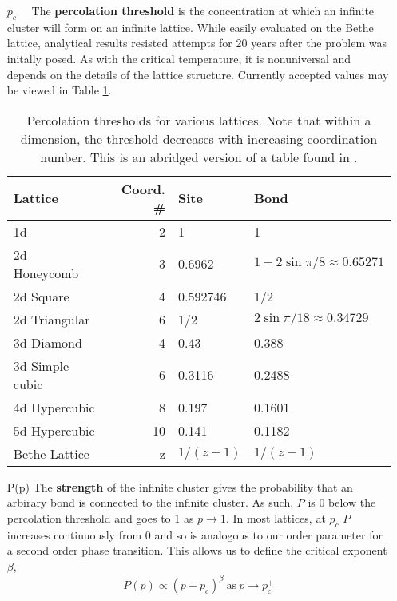 \begin{enumerate}

\item[$p_c\quad$] The \textbf{percolation threshold} is the concentration at which an infinite cluster
will form on an infinite lattice.  While easily evaluated on the Bethe lattice, analytical
results resisted attempts for 20 years after the problem was initally posed.  As with
the critical temperature, it is nonuniversal and depends on the details of the lattice
structure.  Currently accepted values may be viewed in Table \ref{tab:perc_thresh}.

\begin{table}
  \centering
  \begin{tabular}{ | l | r | l | l | }
    \hline
    Lattice & Coord. \# & Site & Bond \\
    \hline \hline
    1d & 2 & 1 & 1 \\ \hline
    2d Honeycomb & 3 & 0.6962 & $1-2\sin{\pi/8}\approx 0.65271$ \\ \hline
    2d Square & 4 & 0.592746 & 1/2 \\ \hline
    2d Triangular & 6 & 1/2 & $2\sin{\pi/18}\approx 0.34729$ \\ \hline
    3d Diamond & 4 & 0.43 & 0.388 \\ \hline
    3d Simple cubic & 6 & 0.3116 & 0.2488 \\ \hline
    4d Hypercubic & 8 & 0.197 & 0.1601 \\ \hline
    5d Hypercubic & 10 & 0.141 & 0.1182 \\ \hline
    Bethe Lattice & z & $1 / (z-1)$ & $1 / (z-1)$ \\ \hline
  \end{tabular}
  \caption{Percolation thresholds for various lattices.  Note that within a dimension,
           the threshold decreases with increasing coordination number.  This is an
           abridged version of a table found in \cite{Christensen2002}.}
  \label{tab:perc_thresh}
\end{table}

\item[P(p)] The \textbf{strength} of the infinite cluster gives the probability that
an arbirary bond is connected to the infinite cluster.  As such, $P$ is 0 below
the percolation threshold and goes to 1 as $p\to 1$.  In most lattices, at $p_c$
$P$ increases continuously from 0 and so is analogous to our order parameter for a second
order phase transition.  This allows us to define the critical exponent $\beta$,
\[ P(p) \propto (p - p_c)^{\beta} \ \text{as}\ p\to p_c^+ \]


\end{enumerate}
